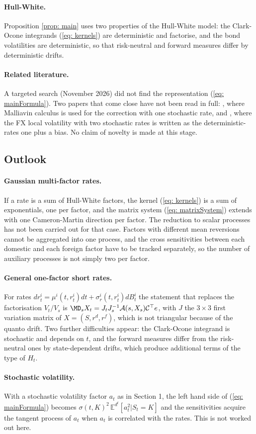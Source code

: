 \paragraph{Hull-White.} Proposition \ref{prop: main} uses two properties of the Hull-White model: the Clark-Ocone integrands (\ref{eq: kernels}) are deterministic and factorise, and the bond volatilities are deterministic, so that risk-neutral and forward measures differ by deterministic drifts.

\paragraph{Related literature.} A targeted search (November 2026) did not find the representation (\ref{eq: mainFormula}). Two papers that come close have not been read in full: \cite{benhamouRivoiraGruz}, where Malliavin calculus is used for the correction with one stochastic rate, and \cite{blochNakashima}, where the FX local volatility with two stochastic rates is written as the deterministic-rates one plus a bias. No claim of novelty is made at this stage.

\subsection{Outlook}
\paragraph{Gaussian multi-factor rates.} If a rate is a sum of Hull-White factors, the kernel (\ref{eq: kernels}) is a sum of exponentials, one per factor, and the matrix system (\ref{eq: matrixSystem}) extends with one Cameron-Martin direction per factor. The reduction to scalar processes has not been carried out for that case. Factors with different mean reversions cannot be aggregated into one process, and the cross sensitivities between each domestic and each foreign factor have to be tracked separately, so the number of auxiliary processes is not simply two per factor.

\paragraph{General one-factor short rates.} For rates $dr^i_t=\mu^i(t,r^i_t)dt+\sigma^i_r(t,r^i_t)dB^i_t$ the statement that replaces the factorisation $V_t/V_s$ is $\MD_sX_t=J_tJ_s^{-1}\mathcal{A}(s,X_s)\mathcal{C}^\top e$, with $J$ the $3\times3$ first variation matrix of $X=(S,r^d,r^f)$, which is not triangular because of the quanto drift. Two further difficulties appear: the Clark-Ocone integrand is stochastic and depends on $t$, and the forward measures differ from the risk-neutral ones by state-dependent drifts, which produce additional terms of the type of $H_t$.

\paragraph{Stochastic volatility.} With a stochastic volatility factor $a_t$ as in Section 1, the left hand side of (\ref{eq: mainFormula}) becomes $\sigma(t,K)^2\,\mathbb{E}^{d^t}[a_t^2|S_t=K]$ and the sensitivities acquire the tangent process of $a_t$ when $a_t$ is correlated with the rates. This is not worked out here.
